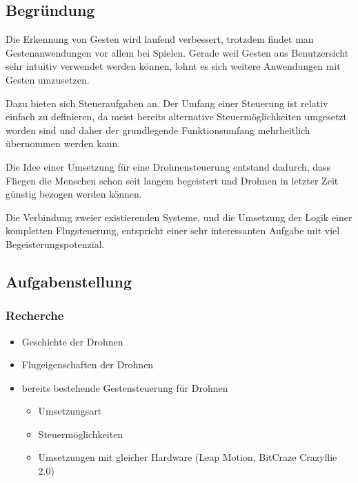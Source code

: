 \subsection{Begründung}
Die Erkennung von Gesten wird laufend verbessert, trotzdem findet man Gestenanwendungen vor allem bei Spielen.
Gerade weil Gesten aus Benutzersicht sehr intuitiv verwendet werden können, lohnt es sich weitere Anwendungen mit Gesten umzusetzen.

Dazu bieten sich Steueraufgaben an.
Der Umfang einer Steuerung ist relativ einfach zu definieren, da meist bereits alternative Steuermöglichkeiten umgesetzt worden sind und daher der grundlegende Funktionsumfang mehrheitlich übernommen werden kann.

Die Idee einer Umsetzung für eine Drohnensteuerung entstand dadurch, dass Fliegen die Menschen schon seit langem begeistert und Drohnen in letzter Zeit günstig bezogen werden können.

Die Verbindung zweier existierenden Systeme, und die Umsetzung der Logik einer kompletten Flugsteuerung, entspricht einer sehr interessanten Aufgabe mit viel Begeisterungspotenzial.


\subsection{Aufgabenstellung}
\subsubsection{Recherche}
\begin{itemize}
	\item Geschichte der Drohnen
	\item Flugeigenschaften der Drohnen
	\item bereits bestehende Gestensteuerung für Drohnen
	\begin{itemize}
		\item Umsetzungsart
		\item Steuermöglichkeiten
		\item Umsetzungen mit gleicher Hardware (Leap Motion, BitCraze Crazyflie 2.0)
	\end{itemize}
\end{itemize}


